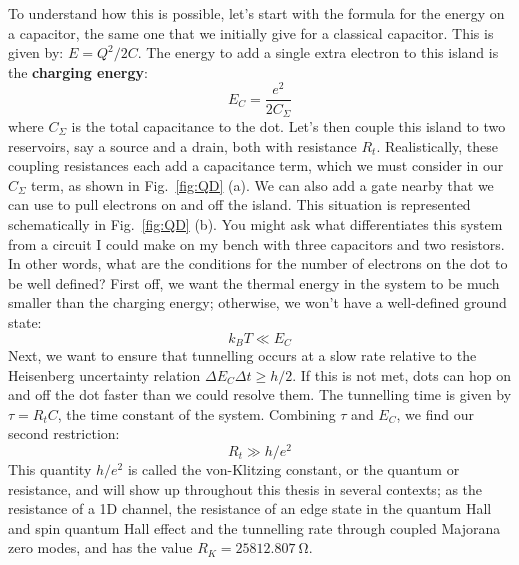 To understand how this is possible, let's start with the formula for the energy on a capacitor, the same one that
we initially give for a classical capacitor. This is given by: $E = Q^2/2C$. The energy to add a single extra electron
to this island is the \textbf{charging energy}:
\begin{equation}
  E_C = \frac{e^2}{2 C_{\Sigma}}
\end{equation}
where $C_\Sigma$ is the total capacitance to the dot. Let's then couple this island to two reservoirs, say a source
and a drain, both with resistance $R_t$. Realistically, these coupling resistances each add a capacitance term, which
we must consider in our $C_\Sigma$ term, as shown in Fig.~\ref{fig:QD} (a). We can also add a gate nearby that we can use to pull electrons on and off
the island. This situation is represented schematically in Fig.~\ref{fig:QD} (b). You might ask what differentiates
this system from a circuit I could make on my bench with three capacitors and two resistors. In other words, what are
the conditions for the number of electrons on the dot to be well defined? First off, we want the thermal energy
in the system to be much smaller than the charging energy; otherwise, we won't have a well-defined ground state:
\begin{equation}
  k_B T \ll E_C
\end{equation}
Next, we want to ensure that tunnelling occurs at a slow rate relative to the Heisenberg uncertainty relation
$\Delta E_C \Delta t \geq h/2$. If this is not met, dots can hop on and off the dot faster than we could resolve them.
The tunnelling time is given by $\tau = R_t C$, the time constant of the system. Combining $\tau$ and $E_C$,
we find our second restriction:
\begin{equation}
  R_t \gg h/e^2
\end{equation}
This quantity $h/e^2$ is called the von-Klitzing constant, or the quantum or resistance, and will show up
throughout this thesis in several contexts; as the resistance of a 1D channel, the resistance of an edge
state in the quantum Hall and spin quantum Hall effect and the tunnelling rate through coupled Majorana zero modes,
and has the value $R_K = \SI{25812.807}{\ohm}$.

